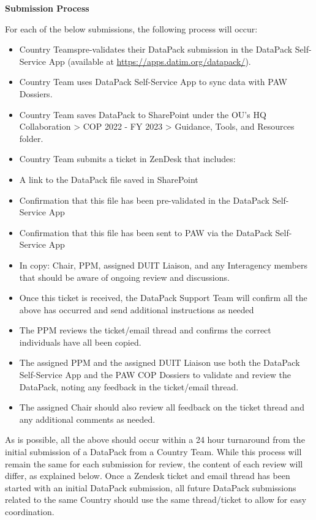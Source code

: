 \documentclass[
  openany]{book}
\begin{document}
\textbf{Submission Process}

For each of the below submissions, the following process will occur:

\begin{itemize}
\item
  Country Teamspre-validates their DataPack submission in the DataPack
  Self-Service App (available at \url{https://apps.datim.org/datapack/}).
\item
  Country Team uses DataPack Self-Service App to sync data with PAW
  Dossiers.
\item
  Country Team saves DataPack to SharePoint under the OU's HQ
  Collaboration \textgreater{} COP 2022 - FY 2023 \textgreater{} Guidance, Tools, and Resources
  folder.
\item
  Country Team submits a ticket in ZenDesk that includes:
\item
  A link to the DataPack file saved in SharePoint
\item
  Confirmation that this file has been pre-validated in the DataPack
  Self-Service App
\item
  Confirmation that this file has been sent to PAW via the DataPack
  Self-Service App
\item
  In copy: Chair, PPM, assigned DUIT Liaison, and any Interagency
  members that should be aware of ongoing review and discussions.
\item
  Once this ticket is received, the DataPack Support Team will confirm
  all the above has occurred and send additional instructions as
  needed
\item
  The PPM reviews the ticket/email thread and confirms the correct
  individuals have all been copied.
\item
  The assigned PPM and the assigned DUIT Liaison use both the DataPack
  Self-Service App and the PAW COP Dossiers to validate and review the
  DataPack, noting any feedback in the ticket/email thread.
\item
  The assigned Chair should also review all feedback on the ticket
  thread and any additional comments as needed.
\end{itemize}

As is possible, all the above should occur within a 24 hour turnaround
from the initial submission of a DataPack from a Country Team. While
this process will remain the same for each submission for review, the
content of each review will differ, as explained below. Once a Zendesk
ticket and email thread has been started with an initial DataPack
submission, all future DataPack submissions related to the same Country
should use the same thread/ticket to allow for easy coordination.
\end{document}
